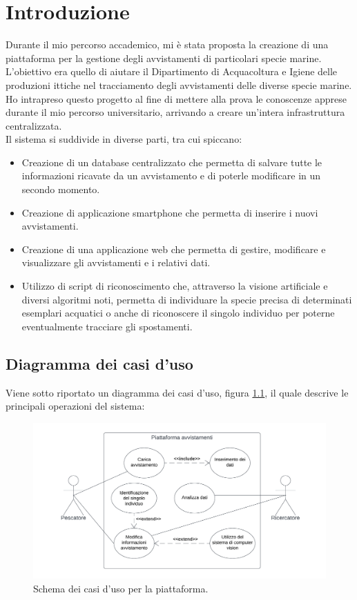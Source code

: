 \documentclass[a4paper,final,12pt]{report}
\begin{document}
\chapter{Introduzione}
Durante il mio percorso accademico, mi è stata proposta la creazione di una piattaforma per la gestione degli avvistamenti di particolari specie marine. L'obiettivo era quello di aiutare il Dipartimento di Acquacoltura e Igiene delle produzioni ittiche nel tracciamento degli avvistamenti delle diverse specie marine.\\
Ho intrapreso questo progetto al fine di mettere alla prova le conoscenze apprese durante il mio percorso universitario, arrivando a creare un'intera infrastruttura centralizzata.\\
Il sistema si suddivide in diverse parti, tra cui spiccano:
\begin{itemize}
\item Creazione di un database centralizzato che permetta di salvare tutte le informazioni ricavate da un avvistamento e di poterle modificare in un secondo momento.
\item Creazione di applicazione smartphone che permetta di inserire i nuovi avvistamenti.
\item Creazione di una applicazione web che permetta di gestire, modificare e visualizzare gli avvistamenti e i relativi dati.
\item Utilizzo di script di riconoscimento che, attraverso la visione artificiale e diversi algoritmi noti, permetta di individuare la specie precisa di determinati esemplari acquatici o anche di riconoscere il singolo individuo per poterne eventualmente tracciare gli spostamenti.
\end{itemize}

\section{Diagramma dei casi d'uso}
Viene sotto riportato un diagramma dei casi d'uso, figura \ref{figura:casiDuso}, il quale descrive le principali operazioni del sistema:

\begin{figure}[hbtp]
\centering
\includegraphics[scale=0.6]{img_concettuale/casi.png}
\caption{Schema dei casi d'uso per la piattaforma.}
\label{figura:casiDuso}
\end{figure}
\end{document}
